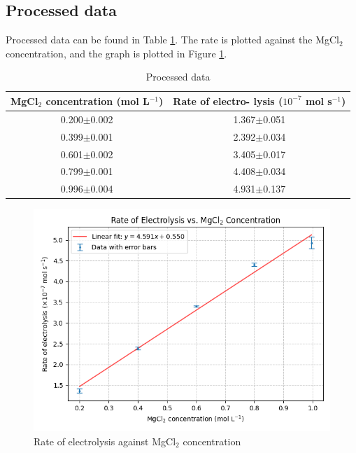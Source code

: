 \documentclass[a4paper]{article}
\begin{document}
\subsection{Processed data}

Processed data can be found in Table \ref{tab.proc}. The rate is plotted against the MgCl$_2$ concentration, and the graph is plotted in Figure \ref{fig.proc}.

\begin{table}[h!]
\centering
\caption{Processed data}
\label{tab.proc}
\begin{tabular}{cc}
\hline
\makecell{MgCl$_2$ concentration\\ (mol L$^{-1}$)} & \makecell{Rate of electro-\\lysis ($10^{-7}$ mol s$^{-1}$)} \\

\hline
0.200$\pm$0.002 & 1.367$\pm$0.051 \\
0.399$\pm$0.001 & 2.392$\pm$0.034 \\
0.601$\pm$0.002 & 3.405$\pm$0.017 \\
0.799$\pm$0.001 & 4.408$\pm$0.034 \\
0.996$\pm$0.004 & 4.931$\pm$0.137 \\
\hline
\end{tabular}
\end{table}

\begin{figure}
    \centering
    \includegraphics[width=\textwidth]{fit.png}
    \caption{Rate of electrolysis against MgCl$_2$ concentration}
    \label{fig.proc}
\end{figure}
\end{document}
